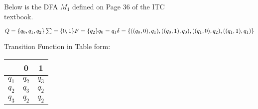\documentclass{scrartcl}
\begin{document}

\begin{comment}
DFA is defined as below and drawn pictorially

Hints:
- for set symbol, use \{ and \}
- for subscript $q_0$
- $ sets up math mode and you end with $
- also when you use special symbols such as _, ^, | etc, then use \$ to
  bracket them
- if $ doesnt match with another $, you will get warnings
- for math symbols, use \delta, \sum, \epsilon etc.
- for more symbols see http://www.artofproblemsolving.com/wiki/index.php?title=LaTeX:Symbols
- use \\ to denote new line
- for defining table, 
  - ||c c c|| defines 3 columns and so on
  - each row values are separated by &
  - use \space if you want to omit a column
- for drawing the DFA, we use tikz package
  - first 3 lines define the states, which one is initial, final etc
  - far right (eg. {$q_1$} will be drawn in the diagram within the circle
  - q1, q2, etc are like local variables used to define the machine
    and the transitions
  - you can specify how you want the arrows to look like--experiment
\end{comment}

Below is the DFA $M_1$ defined on Page 36 of the ITC \\
textbook. 

$
Q = \{q_0, q_1, q_2 \} 				\\
\sum = \{0, 1 \} 					\\
F = \{q_2 \} 						\\
q_0 = q_1 							\\
\delta = \{ 	((q_0, 0), q_1), 
				((q_0, 1), q_0), 
				((q_1, 0), q_2), 
				((q_1, 1), q_1) \} 	\\
$

Transition Function in Table form: \\


\begin{center}
 \begin{tabular}{||c c c||} 
 \hline
 \space & 0 & 1  			\\ [0.5ex]
 \hline
 $q_1$ & $q_2$ & $q_3$ 		\\
 \hline
 $q_2$ & $q_3$ & $q_2$		\\
 \hline
 $q_3$ & $q_2$ & $q_2$		\\
 \hline
\end{tabular}
\end{center}
\end{document}

